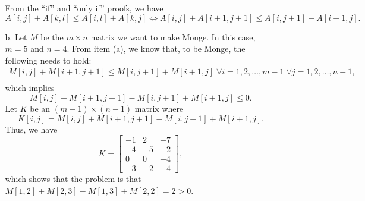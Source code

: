 \documentclass{report}
\makeatletter
\renewenvironment{framed}{%
 \def\FrameCommand##1{\hskip\@totalleftmargin
 \fboxsep=\FrameSep\fbox{##1}}%
 \MakeFramed {\advance\hsize-\width
   \@totalleftmargin\z@ \linewidth\hsize
   \@setminipage}}%
 {\par\unskip\endMakeFramed}
\DeclareMathOperator{\Forall}{\forall}
\makeatother
\begin{document}
\begin{enumerate}
\begin{framed}
\begin{enumerate}
      From the ``if'' and ``only if'' proofs, we have
      \[
        A[i, j] + A[k, l] \le A[i, l] + A[k, j] \iff A[i, j] + A[i + 1, j + 1] \le A[i, j + 1] + A[i + 1, j].
      \]
      \item[b.] Let $M$ be the $m \times n$ matrix we want to make Monge. In
        this case, $m = 5$ and $n = 4$. From item (a), we know that, to be
        Monge, the following needs to hold:
        \begin{equation*}
        \begin{aligned}
        M[i, j] + M[i + 1, j + 1] \le M[i, j + 1] + M[i + 1, j] \; \Forall i = 1, 2, \dots, m - 1 \; \Forall j = 1, 2, \dots, n - 1,\\
        \end{aligned}
        \end{equation*}
      which implies
      \[
        M[i, j] + M[i + 1, j + 1] - M[i, j + 1] + M[i + 1, j] \le 0.
      \]
      Let $K$ be an $(m - 1) \times (n - 1)$ matrix where
      \[
        K[i, j] = M[i, j] + M[i + 1, j + 1] - M[i, j + 1] + M[i + 1, j].
      \]
      Thus, we have
      \[
      K =
      \begin{bmatrix}
      -1 &  2 & -7\\
      -4 & -5 & -2\\
       0 &  0 & -4\\
      -3 & -2 & -4
      \end{bmatrix}
      ,\]
    which shows that the problem is that
    $M[1, 2] + M[2, 3] - M[1, 3] + M[2, 2] = 2 > 0$.


\end{enumerate}
\end{framed}
\end{enumerate}
\end{document}
